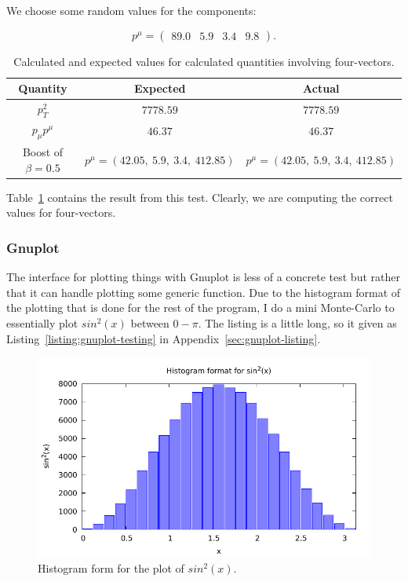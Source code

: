 We choose some random values for the components:

\begin{equation}
  p^\mu = \begin{pmatrix}89.0 & 5.9 & 3.4 & 9.8\end{pmatrix}.
\end{equation}

\begin{table}[ht]
  \centering
  \begin{tabular}{|c|c|c|}
    \hline
    Quantity & Expected & Actual \\ \hline
    $p_T^2$ & $7778.59$ & $7778.59$ \\ \hline
    $p_\mu p^\mu$ & $46.37$ & $46.37$ \\ \hline
    Boost of $\beta = 0.5$ & $p^\mu = (42.05,\ 5.9,\ 3.4,\ 412.85)$ & $p^\mu = (42.05,\ 5.9,\ 3.4,\ 412.85)$ \\ \hline
  \end{tabular}
  \caption{Calculated and expected values for calculated quantities involving four-vectors.}
  \label{tbl:four-vector-tests}
\end{table}

Table~\ref{tbl:four-vector-tests} contains the result from this test. Clearly, we are computing the correct values for four-vectors.

\subsubsection{Gnuplot}

The interface for plotting things with Gnuplot is less of a concrete test but rather that it can handle plotting some generic function. Due to the histogram format of the plotting that is done for the rest of the program, I do a mini Monte-Carlo to essentially plot $sin^2(x)$ between $0-\pi$. The listing is a little long, so it given as Listing~\ref{listing:gnuplot-testing} in Appendix~\ref{sec:gnuplot-listing}.

\begin{figure}[ht]
  \centering
  \includegraphics[width=0.75\linewidth]{./res/gfx/sin2_x.pdf}
  \caption{Histogram form for the plot of $sin^2(x)$.}
  \label{fig:sin2x}
\end{figure}

